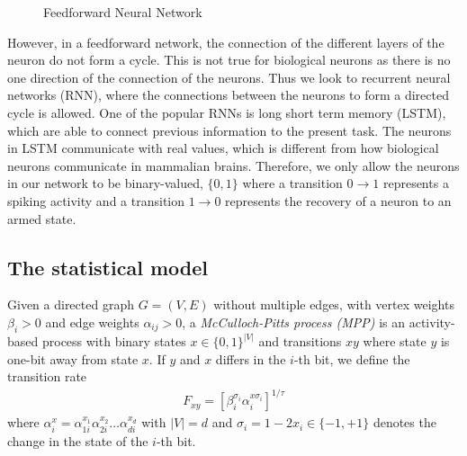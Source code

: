 \begin{figure}[h]
\caption{Feedforward Neural Network}
\label{fig:feedforwardnn}
\end{figure}

However, in a feedforward network, the connection of the different layers of the neuron do not form a cycle. This is not true for biological neurons as there is no one direction of the connection of the neurons. Thus we look to recurrent neural networks (RNN), where the connections between the neurons to form a directed cycle is allowed. One of the popular RNNs is long short term memory (LSTM), which are able to connect previous information to the present task. The neurons in LSTM communicate with real values, which is different from how biological neurons communicate in mammalian brains. Therefore, we only allow the neurons in our network to be binary-valued, $\{0,1\}$ where a transition $0 \to 1$ represents a spiking activity and a transition $1 \to 0$ represents the recovery of a neuron to an armed state.


\subsection*{The statistical model}

Given a directed graph $G=(V,E)$ without multiple edges, with vertex weights $\beta_i > 0$ and edge weights $\alpha_{ij} > 0$, a \emph{McCulloch-Pitts process (MPP)} is an activity-based process with binary states $x \in \{0,1\}^{|V|}$ and transitions $xy$ where state $y$ is one-bit away from state $x$. If $y$ and $x$ differs in the $i$-th bit, we define the transition rate
\begin{align*}
F_{xy} = \left[ \beta_i^{\sigma_i} \alpha_i^{x \sigma_i} \right]^{1/\tau}
\end{align*}
where $\alpha_i^{x} = \alpha_{1i}^{x_1}\alpha_{2i}^{x_2}\ldots\alpha_{di}^{x_{d}}$ with $|V|=d$ and $\sigma_i = 1 - 2x_i \in \{-1,+1\}$ denotes the change in the state of the $i$-th bit.


